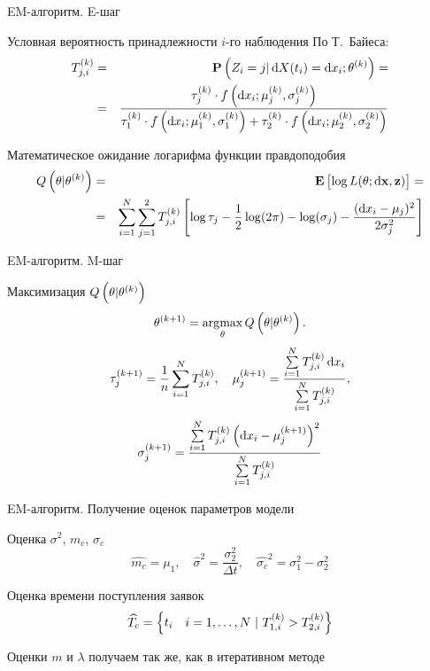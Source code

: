 \documentclass[utf8]{beamer}
\DeclareMathOperator*{\argmax}{\arg\!\max}
\begin{document}
\begin{frame}{EM-алгоритм. E-шаг}
\begin{block}{Условная вероятность принадлежности $i$-го наблюдения}
По Т.~Байеса:
\begin{eqnarray*}
  T_{j,i}^{(k)} 
    &=& \mathbf{P}\del{Z_i = j \vert \dif X(t_i) = \dif x_i; \theta^{(k)}} = \\
    &=& 
    \frac{\tau_j^{(k)} \cdot f\del{\dif x_i; \mu_j^{(k)}, \sigma_j^{(k)}}}
         {\tau_1^{(k)} \cdot f\del{\dif x_i; \mu_1^{(k)}, \sigma_1^{(k)}} + 
         {\tau_2^{(k)} \cdot f\del{\dif x_i; \mu_2^{(k)}, \sigma_2^{(k)}}}}
\end{eqnarray*}
\end{block}
\begin{block}{Математическое ожидание логарифма функции правдоподобия}
\begin{eqnarray*}
  Q\del{\theta \vert \theta^{(k)}} 
    &=& 
    \mathbf{E}\sbr{\log L(\theta; \dif \mathbf{x}, \mathbf{z})} = \\
    &=& \sum\limits_{i=1}^{N} \sum\limits_{j=1}^2
      T_{j,i}^{(k)} 
        \sbr{
          \log \tau_j - 
          \frac{1}{2}\log(2\pi) -
          \log(\sigma_j) -
          \frac{(\dif x_i - \mu_j)^2}{2 \sigma_j^2}
        }
\end{eqnarray*}
\end{block}
\end{frame}


\begin{frame}{EM-алгоритм. M-шаг}
\begin{block}{Максимизация $Q\del{\theta \vert \theta^{(k)}}$}
$$
\theta^{(k+1)} = \argmax\limits_{\theta} Q\del{\theta \vert \theta^{(k)}}.
$$
$$
\tau_j^{(k+1)} = \frac{1}{n} \sum\limits_{i=1}^{N} T_{j,i}^{(k)},\quad
\mu_j^{(k+1)} = \frac
  {\sum\limits_{i=1}^{N} T_{j,i}^{(k)} \dif x_i}
  {\sum\limits_{i=1}^{N} T_{j,i}^{(k)}},
$$
$$
\sigma_j^{(k+1)} = \frac
  {\sum\limits_{i=1}^{N} T_{j,i}^{(k)} \del{\dif x_i - \mu_j^{(k+1)}}^2}
  {\sum\limits_{i=1}^{N} T_{j,i}^{(k)}}
$$
\end{block}
\end{frame}


\begin{frame}{EM-алгоритм. Получение оценок параметров модели}
\begin{block}{Оценка $\sigma^2$, $m_c$, $\sigma_c$}
$$
  \widehat{m_c} = \mu_1, \quad 
  \widehat{\sigma}^2 = \frac{\sigma_2^2}{\Delta t}, \quad
  \widehat{\sigma_c}^2 = \sigma_1^2 - \sigma_2^2
$$
\end{block}
\begin{block}{Оценка времени поступления заявок}
$$\widehat{T_c} = \cbr{t_i \quad i=1,\ldots,N\ \vert\ 
    T_{1,i}^{(k)} > T_{2,i}^{(k)}}$$
\end{block}

Оценки $m$ и $\lambda$ получаем так же, как в итеративном методе
\end{frame}
\end{document}
